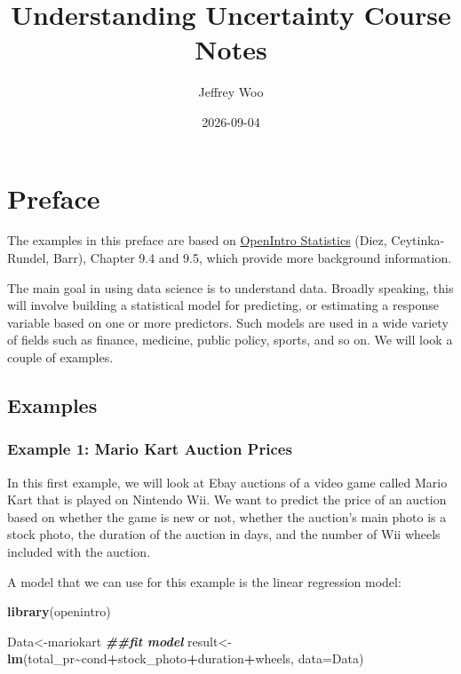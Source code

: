 \documentclass[
]{book}
\title{Understanding Uncertainty Course Notes}
\author{Jeffrey Woo}
\date{2026-09-04}
\newenvironment{Shaded}{\begin{snugshade}}{\end{snugshade}}
\newcommand{\AttributeTok}[1]{\textcolor[rgb]{0.13,0.29,0.53}{#1}}
\newcommand{\DocumentationTok}[1]{\textcolor[rgb]{0.56,0.35,0.01}{\textbf{\textit{#1}}}}
\newcommand{\FunctionTok}[1]{\textcolor[rgb]{0.13,0.29,0.53}{\textbf{#1}}}
\newcommand{\NormalTok}[1]{#1}
\newcommand{\OtherTok}[1]{\textcolor[rgb]{0.56,0.35,0.01}{#1}}
\newcommand{\SpecialCharTok}[1]{\textcolor[rgb]{0.81,0.36,0.00}{\textbf{#1}}}
\begin{document}
\maketitle

{
\setcounter{tocdepth}{1}
\tableofcontents
}
\hypertarget{preface}{%
\chapter*{Preface}\label{preface}}

The examples in this preface are based on \href{https://www.openintro.org/book/os/}{OpenIntro Statistics} (Diez, Ceytinka-Rundel, Barr), Chapter 9.4 and 9.5, which provide more background information.

The main goal in using data science is to understand data. Broadly speaking, this will involve building a statistical model for predicting, or estimating a response variable based on one or more predictors. Such models are used in a wide variety of fields such as finance, medicine, public policy, sports, and so on. We will look a couple of examples.

\hypertarget{examples}{%
\section*{Examples}\label{examples}}

\hypertarget{example-1-mario-kart-auction-prices}{%
\subsection*{Example 1: Mario Kart Auction Prices}\label{example-1-mario-kart-auction-prices}}

In this first example, we will look at Ebay auctions of a video game called Mario Kart that is played on Nintendo Wii. We want to predict the price of an auction based on whether the game is new or not, whether the auction's main photo is a stock photo, the duration of the auction in days, and the number of Wii wheels included with the auction.

A model that we can use for this example is the linear regression model:

\begin{Shaded}
\begin{Highlighting}[]
\FunctionTok{library}\NormalTok{(openintro)}

\NormalTok{Data}\OtherTok{\textless{}{-}}\NormalTok{mariokart}
\DocumentationTok{\#\#fit model}
\NormalTok{result}\OtherTok{\textless{}{-}}\FunctionTok{lm}\NormalTok{(total\_pr}\SpecialCharTok{\textasciitilde{}}\NormalTok{cond}\SpecialCharTok{+}\NormalTok{stock\_photo}\SpecialCharTok{+}\NormalTok{duration}\SpecialCharTok{+}\NormalTok{wheels, }\AttributeTok{data=}\NormalTok{Data)}
\end{Highlighting}
\end{Shaded}
\end{document}
